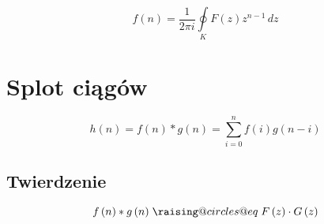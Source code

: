 \documentclass[a4paper,12pt]{article}
\makeatletter
\newcommand{\odpowiada}{\mathrel{\mathpalette\raising@circles@eq\relax}}
\newcommand{\raising@circles@eq}[2]{%
  \vphantom{#1+}%
  \vbox{
    \settowidth\unitlength{$#1\mspace{2mu}$}%
    \offinterlineskip\m@th
    \ialign{##\cr
      \hfil\small@circle{#1}$#1\mspace{1.5mu}$\cr\noalign{\vskip0.5\unitlength}
      $#1=$\cr\noalign{\post@vskip{+}{#1}}
      $#1\mspace{1.5mu}$\small@circle{#1}\hfill\cr\noalign{\post@vskip{-}{#1}}
    }%
  }%
}
\newcommand{\small@circle}[1]{%
  \smash{%
    \begin{picture}(1,1)
    \small@linethickness{#1}
    \put(0.5,0.5){\circle{1}}
    \end{picture}%
  }%
}
\newcommand{\small@linethickness}[1]{%
  \linethickness{%
      \ifx#1\displaystyle 0.8\fontdimen8\textfont3\else
      \ifx#1\textstyle 0.8\fontdimen8\textfont3\else
      \ifx#1\scriptstyle0.8\fontdimen8\scriptfont3\else
      1\fontdimen8\scriptscriptfont3\fi\fi\fi
  }%
}
\newcommand{\post@vskip}[2]{%
  \expandafter\vskip\expanded{%
    #1\ifx#2\scriptscriptstyle0.9\else\ifx#2\scriptstyle0.6\else0.3\fi\fi\unitlength
  }%
}
\makeatother
\begin{document}
\begin{multicols}{2}
\[
    f \left(n\right) = \frac{1}{2 \pi i} \oint \limits_K F\left(z\right) z^{n - 1}\, dz
\]

\section{Splot ciągów} 

\[
    h \left( n \right) = f \left( n \right) * g \left( n \right) = \sum \limits^n_{i = 0} f \left(i\right) g \left( n - i\right)
\]

\subsection*{Twierdzenie}

\[
    f \left( n \right) * g \left( n \right) \odpowiada F \left(z\right) \cdot G \left( z \right)
\]
\end{multicols}
\end{document}
